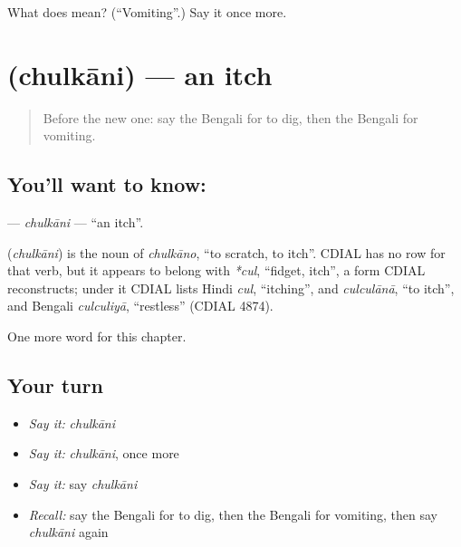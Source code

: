 \begin{tcolorbox}[breakable,colback=teal!4,colframe=teal!35!black,title={Before you move on}]
What does  mean? (\textquotedblleft{}Vomiting\textquotedblright{}.) Say it once more.
\end{tcolorbox}
\section[\texorpdfstring{\bn{চুলকানি} (chulkāni)}{চুলকানি (chulkāni)}]{ (chulkāni) — an itch}

\label{lesson:BN-C243-chulkani}



\begin{quote}
Before the new one: say the Bengali for to dig, then the Bengali for vomiting.
\end{quote}

\subsection*{You'll want to know: }
\textbf{} — \emph{chulkāni} — \textquotedblleft{}an itch\textquotedblright{}.

\begin{cousinweb}
\textbf{} (\emph{chulkāni}) is the noun of \emph{chulkāno}, \textquotedblleft{}to scratch, to itch\textquotedblright{}. CDIAL has no row for that verb, but it appears to belong with \emph{*cul}, \textquotedblleft{}fidget, itch\textquotedblright{}, a form CDIAL reconstructs; under it CDIAL lists Hindi \emph{cul}, \textquotedblleft{}itching\textquotedblright{}, and \emph{culculānā}, \textquotedblleft{}to itch\textquotedblright{}, and Bengali \emph{culculiyā}, \textquotedblleft{}restless\textquotedblright{} (CDIAL 4874).
\end{cousinweb}

\begin{grammarlens}[title={What you've built}]
One more word for this chapter.
\end{grammarlens}

\subsection*{Your turn}
\begin{itemize}
\raggedright
  \item \emph{Say it:} \emph{chulkāni}
  \item \emph{Say it:} \emph{chulkāni}, once more
  \item \emph{Say it:} say \emph{chulkāni}
  \item \emph{Recall:} say the Bengali for to dig, then the Bengali for vomiting, then say \emph{chulkāni} again
\end{itemize}

